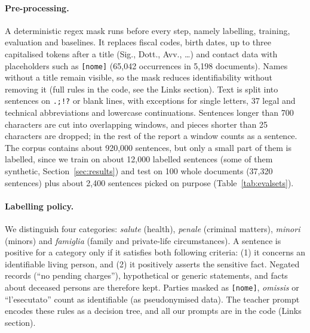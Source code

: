 \documentclass[11pt]{article}
\begin{document}
\paragraph{Pre-processing.} A deterministic regex mask runs before every step, namely labelling, training, evaluation and baselines. It replaces fiscal codes, birth dates, up to three capitalised tokens after a title (Sig., Dott., Avv., \dots) and contact data with placeholders such as \texttt{[nome]} (65,042 occurrences in 5,198 documents). Names without a title remain visible, so the mask reduces identifiability without removing it (full rules in the code, see the Links section). Text is split into sentences on \texttt{.;!?} or blank lines, with exceptions for single letters, 37 legal and technical abbreviations and lowercase continuations. Sentences longer than 700 characters are cut into overlapping windows, and pieces shorter than 25 characters are dropped; in the rest of the report a window counts as a sentence. The corpus contains about 920,000 sentences, but only a small part of them is labelled, since we train on about 12,000 labelled sentences (some of them synthetic, Section~\ref{sec:results}) and test on 100 whole documents (37,320 sentences) plus about 2,400 sentences picked on purpose (Table~\ref{tab:evalsets}).

\paragraph{Labelling policy.} We distinguish four categories: \emph{salute} (health), \emph{penale} (criminal matters), \emph{minori} (minors) and \emph{famiglia} (family and private-life circumstances). A sentence is positive for a category only if it satisfies both following criteria: (1) it concerns an identifiable living person, and (2) it positively asserts the sensitive fact. Negated records (``no pending charges''), hypothetical or generic statements, and facts about deceased persons are therefore kept. Parties masked as \texttt{[nome]}, \emph{omissis} or ``l'esecutato'' count as identifiable (as pseudonymised data). The teacher prompt encodes these rules as a decision tree, and all our prompts are in the code (Links section).
\end{document}
